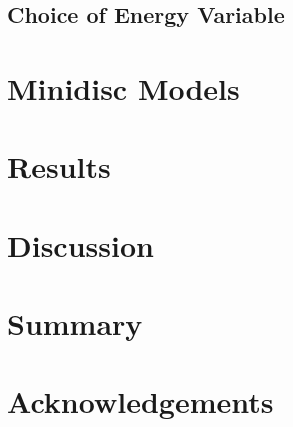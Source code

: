 \documentclass{emulateapj}
\begin{document}
\subsection{Choice of Energy Variable}
\label{sec:energy}








\section{Minidisc Models}
\label{sec:models}




\section{Results}
\label{sec:results}




\section{Discussion}
\label{sec:discussion}




\section{Summary}
\label{sec:summary}





\section{Acknowledgements}


\newpage





%
\end{document}
